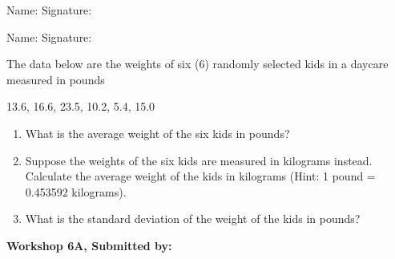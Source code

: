 \documentclass[11pt]{book}\usepackage[]{graphicx}\usepackage[]{color}
\begin{document}
\begin{exercises}
\begin{exercise}
\begin{center}
{{\vspace{4mm}
Name: \underline{\phantom{xxxxxxxxxxxxxxxxxxxxxxxx}} Signature: \underline{\phantom{xxxxxxxxxxxxxxxxxxxxxxxx}}

\vspace{4mm}
Name: \underline{\phantom{xxxxxxxxxxxxxxxxxxxxxxxx}} Signature: \underline{\phantom{xxxxxxxxxxxxxxxxxxxxxxxx}}
 }}
\end{center}

The data below are the weights of six (6) randomly selected kids in a daycare measured in pounds

 13.6, 16.6, 23.5, 10.2, 5.4, 15.0

\begin{enumerate}
  \item What is the average weight of the six kids in pounds?
  \item Suppose the weights of the six kids are measured in kilograms instead. Calculate the average weight of the kids in kilograms (Hint: 1 pound = 0.453592 kilograms).
  \item What is the standard deviation of the weight of the kids in pounds?
\end{enumerate}


\end{exercise}
\begin{solution}  %

\end{solution}


\clearpage

    \begin{exercise}  %

    \begin{center}
\begin{flushleft}\textbf{\large \hfill Workshop 6A, Submitted by: }\end{flushleft}

\end{center}
\end{exercise}
\end{exercises}
\end{document}
